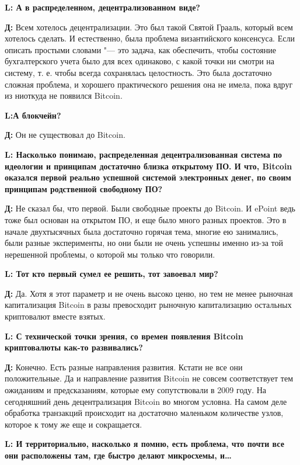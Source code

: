 \documentclass[10pt, a5paper]{article}
\begin{document}
{\noindent \bf L: А в распределенном, децентрализованном виде?}

{\noindent \bf Д:} Всем хотелось децентрализации. Это был такой Святой Грааль, который всем хотелось сделать. И естественно, была проблема византийского консенсуса. Если описать простыми словами "--- это задача, как обеспечить, чтобы состояние бухгалтерского учета было для всех одинаково, с какой точки ни смотри на систему, т. е. чтобы всегда сохранялась целостность. Это была достаточно сложная проблема, и хорошего практического решения она не имела, пока вдруг из ниоткуда не появился Bitcoin.

{\noindent \bf L:А блокчейн?}

{\noindent \bf Д:} Он не существовал до Bitcoin. 

{\noindent \bf L: Насколько понимаю, распределенная децентрализованная система по идеологии и принципам достаточно близка открытому ПО. И что, Bitcoin оказался первой реально успешной системой электронных денег, по своим принципам родственной свободному ПО?}

{\noindent \bf Д:} Не сказал бы, что первой. Были свободные проекты до Bitcoin. И ePoint ведь тоже был основан на открытом ПО, и еще было много разных проектов. Это в начале двухтысячных была достаточно горячая тема, многие ею занимались, были разные эксперименты, но они были не очень успешны именно из-за той нерешенной проблемы, о которой мы только что говорили.

{\noindent \bf L: Тот кто первый сумел ее решить, тот завоевал мир?}

{\noindent \bf Д:} Да. Хотя я этот параметр и не очень высоко ценю, но тем не менее рыночная капитализация Bitcoin в разы превосходит рыночную капитализацию остальных криптовалют вместе взятых.

{\noindent \bf L: С технической точки зрения, со времен появления Bitcoin криптовалюты как-то развивались?}

{\noindent \bf Д:} Конечно. Есть разные направления развития. Кстати не все они положительные. Да и направление развития Bitcoin не совсем соответствует тем ожиданиям и предсказаниям, которые ему сопутствовали в 2009 году.  На сегодняшний день децентрализация Bitcoin во многом условна. На самом деле обработка транзакций происходит на достаточно маленьком количестве узлов, которое к тому же еще и сокращается.

{\noindent \bf L: И территориально, насколько я помню, есть проблема, что почти все они расположены там, где быстро делают микросхемы, и\ldots}
\end{document}
